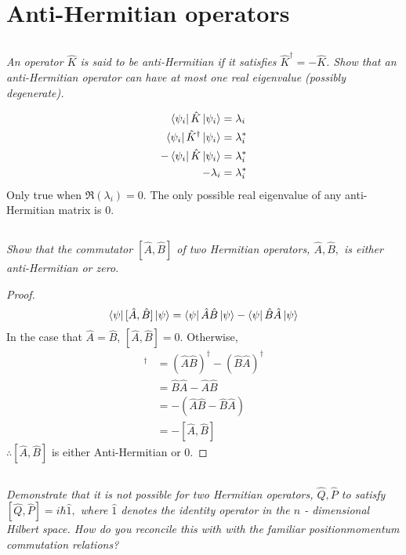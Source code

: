 \documentclass{article}
\begin{document}
\newpage
\section{Anti-Hermitian operators}
\subsection{}
\textit{An operator $\hat{K}$ is said to be anti-Hermitian if it satisfies $\hat{K}^{\dagger}=-\hat{K}$. Show that an anti-Hermitian operator can have at most one real eigenvalue (possibly degenerate).}

\begin{align*}
    \bra{\psi_i} \hat K \ket{\psi_i} &= \lambda_i \\
    \bra{\psi_i} \hat{K}^\dagger \ket{\psi_i} &= \lambda_i^* \\
    -\bra{\psi_i} \hat{K} \ket{\psi_i} &= \lambda_i^* \\
    -\lambda_i &= \lambda_i^* 
\end{align*}
Only true when $\Re\left(\lambda_i\right)= 0$. The only possible real eigenvalue of any anti-Hermitian matrix is 0. 

\subsection{}
\textit{Show that the commutator $[\hat{A}, \hat{B}]$ of two Hermitian operators, $\hat{A}, \hat{B},$ is either anti-Hermitian or zero.}
\begin{proof}
\begin{equation*}
    \bra{\psi} [\hat{A}, \hat{B}] \ket{\psi} = \bra{\psi} \hat{A}\hat{B} \ket{\psi} -\bra{\psi} \hat{B}\hat{A} \ket{\psi} 
\end{equation*}
In the case that $\hat{A}= \hat{B}$, $[\hat{A}, \hat{B}] = 0$. Otherwise, 
\begin{align*}
    [\hat{A}, \hat{B}]^\dagger &= \left(\hat{A} \hat{B} \right)^\dagger - \left(\hat{B} \hat{A} \right)^\dagger \\
    &=\hat{B} \hat{A} -\hat{A} \hat{B}\\
    &=-\left(\hat{A} \hat{B}-\hat{B} \hat{A}  \right)\\
    &= - [\hat{A}, \hat{B}]
\end{align*}
$\therefore \left[\hat{A}, \hat{B}\right]$ is either Anti-Hermitian or 0.  
\end{proof}

\subsection{}
\textit{Demonstrate that it is not possible for two Hermitian operators, $\hat{Q}, \hat{P}$ to satisfy $[\hat{Q}, \hat{P}]=i \hbar \hat{1},$ where $\hat{1}$ denotes the identity operator in the $n$ - dimensional Hilbert space. How do you reconcile this with with the familiar positionmomentum commutation relations?}
\end{document}
